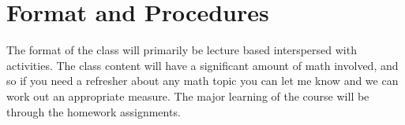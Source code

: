 \documentclass[a4paper]{article}
\begin{document}


\section{Format and Procedures}


The format of the class will primarily be lecture based interspersed with activities. The class content will have a significant amount of math involved, and so if you need a refresher about any math topic you can let me know and we can work out an appropriate measure. The major learning of the course will be through the homework assignments. \\
\end{document}
